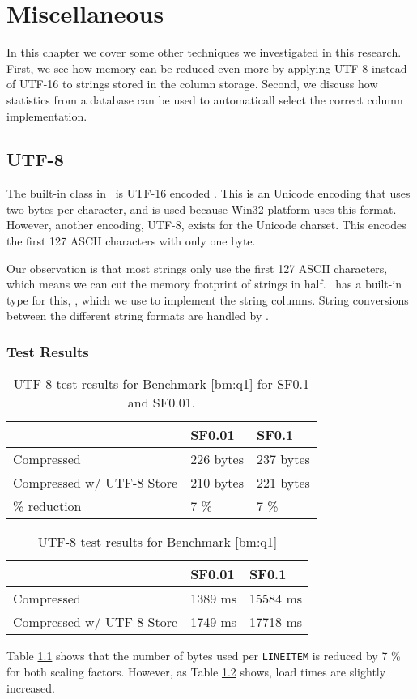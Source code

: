 \chapter{Miscellaneous}
\label{chp:misc}
In this chapter we cover some other techniques we investigated in this research. First, we see how memory can be reduced even more by applying UTF-8 instead of UTF-16 to strings stored in the column storage. Second, we discuss how statistics from a database can be used to automaticall select the correct column implementation.

\section{UTF-8}
\label{sec:UTF-8}
The built-in  class in \delphi~is UTF-16 encoded \cite{noauthor_undated-cp}. This is an Unicode encoding that uses two bytes per character, and is used because Win32 platform uses this format. However, another encoding, UTF-8, exists for the Unicode charset. This encodes the first 127 ASCII characters with only one byte. 

Our observation is that most strings only use the first 127 ASCII characters, which means we can cut the memory footprint of strings in half. \delphi~has a built-in type for this, , which we use to implement the string columns. String conversions between the different string formats are handled by \delphi.

\subsection{Test Results}
\label{sub:Test Results}
\begin{table}
    \begin{tabularx}{0.75\textwidth}{X | X X}
        & SF0.01 & SF0.1 \\ 
        \hline
        \hline
        Compressed & 226 bytes & 237 bytes \\
        Compressed w/ UTF-8 Store & 210 bytes & 221 bytes \\
        \% reduction & 7 \% & 7 \% \\
    \end{tabularx}
    \caption{UTF-8 test results for Benchmark \ref{bm:q1} for SF0.1 and SF0.01.}
    \label{tab:utf-8-bpl}
\end{table}
\begin{table}
    \begin{tabularx}{0.75\textwidth}{X | X X}
        & SF0.01 & SF0.1 \\ 
        \hline
        \hline
        Compressed & 1389 ms & 15584 ms \\
        Compressed w/ UTF-8 Store & 1749 ms & 17718 ms \\
    \end{tabularx}
    \caption{UTF-8 test results for Benchmark \ref{bm:q1}}
    \label{tab:utf-8-load}
\end{table}
Table \ref{tab:utf-8-bpl} shows that the number of bytes used per \texttt{LINEITEM} is reduced by 7 \% for both scaling factors. However, as Table \ref{tab:utf-8-load} shows, load times are slightly increased.

